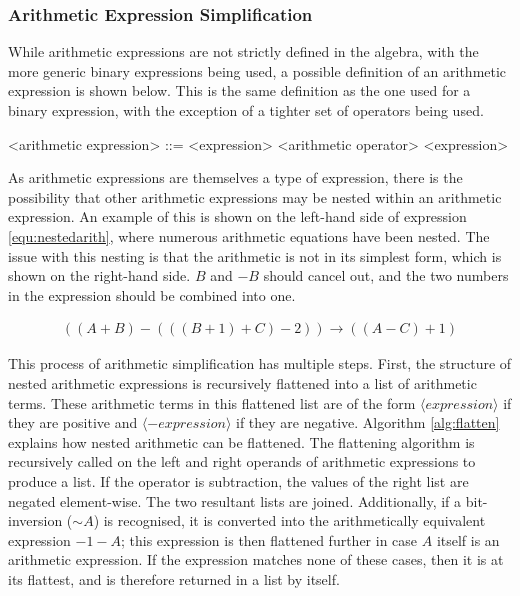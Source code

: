 \subsubsection{Arithmetic Expression Simplification}
While arithmetic expressions are not strictly defined in the algebra, with the more generic binary expressions being used, a possible definition of an arithmetic expression is shown below. This is the same definition as the one used for a binary expression, with the exception of a tighter set of operators being used. 
\setlength{\grammarindent}{4.5cm}
\begin{grammar}
    <arithmetic expression> ::= <expression> <arithmetic operator> <expression>
\end{grammar}
As arithmetic expressions are themselves a type of expression, there is the possibility that other arithmetic expressions may be nested within an arithmetic expression. An example of this is shown on the left-hand side of expression \ref{equ:nestedarith}, where numerous arithmetic equations have been nested. The issue with this nesting is that the arithmetic is not in its simplest form, which is shown on the right-hand side. $B$ and $-B$ should cancel out, and the two numbers in the expression should be combined into one.

\begin{align} \label{equ:nestedarith}
    ((A + B) - (((B + 1) + C) - 2)) \rightarrow ((A - C) + 1)
\end{align}

This process of arithmetic simplification has multiple steps. First, the structure of nested arithmetic expressions is recursively flattened into a list of arithmetic terms. These arithmetic terms in this flattened list are of the form $\langle expression \rangle$ if they are positive and $\langle - expression \rangle$ if they are negative. Algorithm \ref{alg:flatten} explains how nested arithmetic can be flattened. The flattening algorithm is recursively called on the left and right operands of arithmetic expressions to produce a list. If the operator is subtraction, the values of the right list are negated element-wise. The two resultant lists are joined. Additionally, if a bit-inversion ($\sim A$) is recognised, it is converted into the arithmetically equivalent expression $-1 - A$; this expression is then flattened further in case $A$ itself is an arithmetic expression. If the expression matches none of these cases, then it is at its flattest, and is therefore returned in a list by itself.

